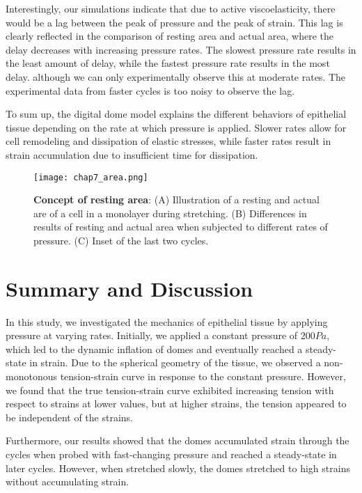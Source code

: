 Interestingly, our simulations indicate that due to active viscoelasticity, there would be a lag between the peak of pressure and the peak of strain. This lag is clearly reflected in the comparison of resting area and actual area, where the delay decreases with increasing pressure rates. The slowest pressure rate results in the least amount of delay, while the fastest pressure rate results in the most delay. although we can only experimentally observe this at moderate rates. The experimental data from faster cycles is too noisy to observe the lag.

To sum up, the digital dome model explains the different behaviors of epithelial tissue depending on the rate at which pressure is applied. Slower rates allow for cell remodeling and dissipation of elastic stresses, while faster rates result in strain accumulation due to insufficient time for dissipation.

\begin{figure}
	\centering
	\texttt{[image: chap7\_area.png]}
	\caption{\label{fig_7_8} \textbf{Concept of resting area}: (A) Illustration of a resting and actual are of a cell in a monolayer during stretching. (B) Differences in results of resting and actual area when subjected to different rates of pressure. (C) Inset of the last two cycles.
	}
\end{figure}

\hypertarget{summary}{%
	\section{Summary and Discussion}\label{summary}}

In this study, we investigated the mechanics of epithelial tissue by applying pressure at varying rates. Initially, we applied a constant pressure of $200Pa$, which led to the dynamic inflation of domes and eventually reached a steady-state in strain. Due to the spherical geometry of the tissue, we observed a non-monotonous tension-strain curve in response to the constant pressure. However, we found that the true tension-strain curve exhibited increasing tension with respect to strains at lower values, but at higher strains, the tension appeared to be independent of the strains.

Furthermore, our results showed that the domes accumulated strain through the cycles when probed with fast-changing pressure and reached a steady-state in later cycles. However, when stretched slowly, the domes stretched to high strains without accumulating strain.

